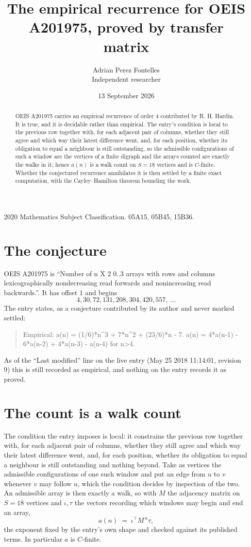 \documentclass[11pt,a4paper]{article}
\title{The empirical recurrence for OEIS A201975, proved by transfer matrix}
\author{Adrian Perez Fontelles\\ \small Independent researcher}
\date{13 September 2026}
\theoremstyle{plain}
\theoremstyle{definition}
\begin{document}
\maketitle

\begin{abstract}
OEIS A201975 carries an empirical recurrence of order $4$ contributed by R. H. Hardin. It is
true, and it is decidable rather than empirical. The entry's condition is local to the previous row together with, for each adjacent pair of columns, whether they still agree and which way their latest difference went, and, for each position, whether its obligation to equal a neighbour is still outstanding, so
the admissible configurations of such a window are the vertices of a finite digraph and the
arrays counted are exactly the walks in it; hence $a(n)$ is a walk count on $S=18$ vertices
and is $C$-finite. Whether the conjectured recurrence annihilates it is then settled by a
finite exact computation, with the Cayley--Hamilton theorem bounding the work.
\end{abstract}

\noindent\small 2020 Mathematics Subject Classification. 05A15, 05B45, 15B36.\normalsize

\section{The conjecture}

OEIS A201975 is ``Number of n X 2 0..3 arrays with rows and columns lexicographically nondecreasing read forwards and nonincreasing read backwards.''. It has offset $1$ and begins
\[
4, 30, 72, 131, 208, 304, 420, 557,\ \dots
\]
The entry states, as a conjecture contributed by its author and never marked settled:
\begin{quote}
Empirical: a(n) = (1/6)*n\^{}3 + 7*n\^{}2 + (23/6)*n - 7. a(n) = 4*a(n-1) - 6*a(n-2) + 4*a(n-3) - a(n-4) for n>4.
\end{quote}
As of the ``Last modified'' line on the live entry (May 25 2018 11:14:01, revision 9) this is still
recorded as empirical, and nothing on the entry records it as proved.

\section{The count is a walk count}

The condition the entry imposes is local: it constrains the previous row together with, for each adjacent pair of columns, whether they still agree and which way their latest difference went, and, for each position, whether its obligation to equal a neighbour is still outstanding and nothing beyond. Take as
vertices the admissible configurations of one such window and put an edge from $u$ to $v$
whenever $v$ may follow $u$, which the condition decides by inspection of the two. An
admissible array is then exactly a walk, so with $M$ the adjacency matrix on $S=18$ vertices
and $\iota,\tau$ the vectors recording which windows may begin and end an array,
\[
a(n)\;=\;\iota^{\!\top}M^{\,n}\tau ,
\]
the exponent fixed by the entry's own shape and checked against its published terms. In
particular $a$ is $C$-finite.
\end{document}
